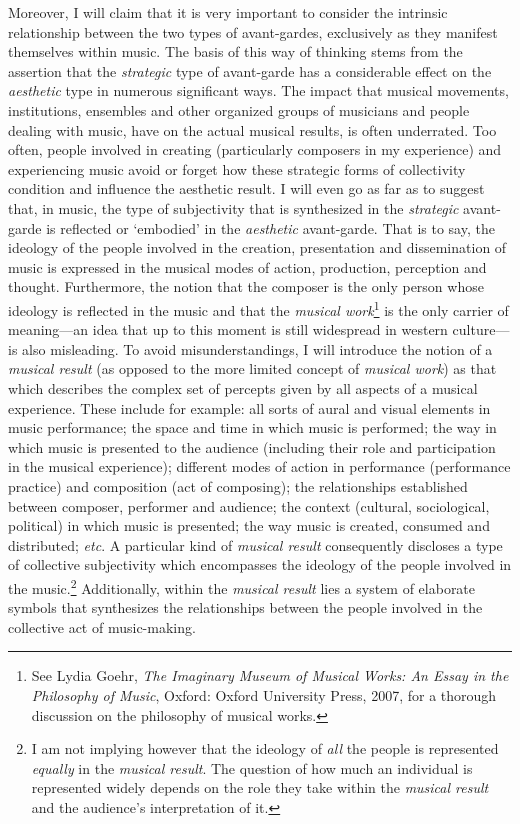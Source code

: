 Moreover, I will claim that it is very important to consider the intrinsic relationship between the two types of avant-gardes, exclusively as they manifest themselves within music. The basis of this way of thinking stems from the assertion that the \emph{strategic} type of avant-garde has a considerable effect on the \emph{aesthetic} type in numerous significant ways. The impact that musical movements, institutions, ensembles and other organized groups of musicians and people dealing with music, have on the actual musical results, is often underrated. Too often, people involved in creating (particularly composers in my experience) and experiencing music avoid or forget how these strategic forms of collectivity condition and influence the aesthetic result. I will even go as far as to suggest that, in music, the type of subjectivity that is synthesized in the \emph{strategic} avant-garde is reflected or `embodied' in the \emph{aesthetic} avant-garde. That is to say, the ideology of the people involved in the creation, presentation and dissemination of music is expressed in the musical modes of action, production, perception and thought. Furthermore, the notion that the composer is the only person whose ideology is reflected in the music and that the \emph{musical work}\footnote{See Lydia Goehr, \emph{The Imaginary Museum of Musical Works: An Essay in the Philosophy of Music}, Oxford: Oxford University Press, 2007, for a thorough discussion on the philosophy of musical works.} is the only carrier of meaning---an idea that up to this moment is still widespread in western culture---is also misleading. To avoid misunderstandings, I will introduce the notion of a \emph{musical result} (as opposed to the more limited concept of \emph{musical work}) as that which describes the complex set of percepts given by all aspects of a musical experience. These include for example: all sorts of aural and visual elements in music performance; the space and time in which music is performed; the way in which music is presented to the audience (including their role and participation in the musical experience); different modes of action in performance (performance practice) and composition (act of composing); the relationships established between composer, performer and audience; the context (cultural, sociological, political) in which music is presented; the way music is created, consumed and distributed; \emph{etc}. A particular kind of \emph{musical result} consequently discloses a type of collective subjectivity which encompasses the ideology of the people involved in the music.\footnote{I am not implying however that the ideology of \emph{all} the people is represented \emph{equally} in the \emph{musical result}. The question of how much an individual is represented widely depends on the role they take within the \emph{musical result} and the audience's interpretation of it.} Additionally, within the \emph{musical result} lies a system of elaborate symbols that synthesizes the relationships between the people involved in the collective act of music-making.

